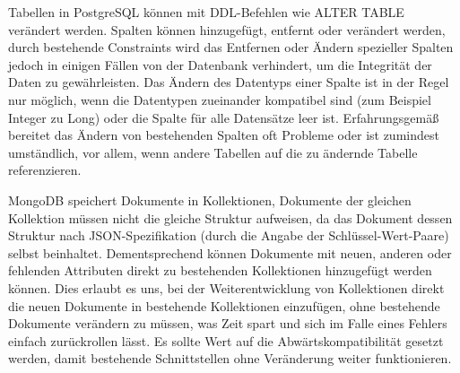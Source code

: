 Tabellen in PostgreSQL können mit DDL-Befehlen wie ALTER TABLE verändert werden. Spalten können hinzugefügt, entfernt oder verändert werden, durch bestehende Constraints wird das Entfernen oder Ändern spezieller Spalten jedoch in einigen Fällen von der Datenbank verhindert, um die Integrität der Daten zu gewährleisten. Das Ändern des Datentyps einer Spalte ist in der Regel nur möglich, wenn die Datentypen zueinander kompatibel sind (zum Beispiel Integer zu Long) oder die Spalte für alle Datensätze leer ist. Erfahrungsgemäß bereitet das Ändern von bestehenden Spalten oft Probleme oder ist zumindest umständlich, vor allem, wenn andere Tabellen auf die zu ändernde Tabelle referenzieren.

MongoDB speichert Dokumente in Kollektionen, Dokumente der gleichen Kollektion müssen nicht die gleiche Struktur aufweisen, da das Dokument dessen Struktur nach JSON-Spezifikation (durch die Angabe der Schlüssel-Wert-Paare) selbst beinhaltet. Dementsprechend können Dokumente mit neuen, anderen oder fehlenden Attributen direkt zu bestehenden Kollektionen hinzugefügt werden können. Dies erlaubt es uns, bei der Weiterentwicklung von Kollektionen direkt die neuen Dokumente in bestehende Kollektionen einzufügen, ohne bestehende Dokumente verändern zu müssen, was Zeit spart und sich im Falle eines Fehlers einfach zurückrollen lässt. Es sollte Wert auf die Abwärtskompatibilität gesetzt werden, damit bestehende Schnittstellen ohne Veränderung weiter funktionieren.


